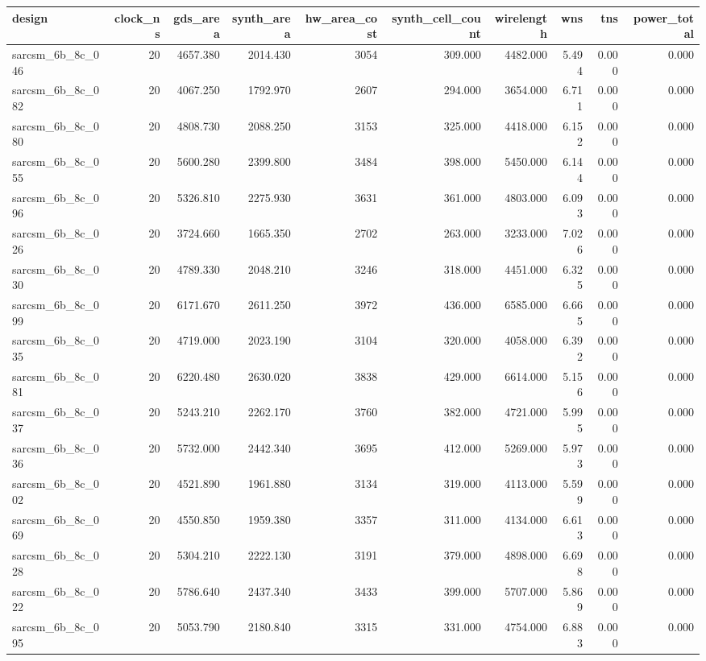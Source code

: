 \begin{tabular}{lrrrrrrrrr}
\toprule
design & clock\_ns & gds\_area & synth\_area & hw\_area\_cost & synth\_cell\_count & wirelength & wns & tns & power\_total \\
\midrule
sarcsm\_6b\_8c\_046 & 20 & 4657.380 & 2014.430 & 3054 & 309.000 & 4482.000 & 5.494 & 0.000 & 0.000 \\
sarcsm\_6b\_8c\_082 & 20 & 4067.250 & 1792.970 & 2607 & 294.000 & 3654.000 & 6.711 & 0.000 & 0.000 \\
sarcsm\_6b\_8c\_080 & 20 & 4808.730 & 2088.250 & 3153 & 325.000 & 4418.000 & 6.152 & 0.000 & 0.000 \\
sarcsm\_6b\_8c\_055 & 20 & 5600.280 & 2399.800 & 3484 & 398.000 & 5450.000 & 6.144 & 0.000 & 0.000 \\
sarcsm\_6b\_8c\_096 & 20 & 5326.810 & 2275.930 & 3631 & 361.000 & 4803.000 & 6.093 & 0.000 & 0.000 \\
sarcsm\_6b\_8c\_026 & 20 & 3724.660 & 1665.350 & 2702 & 263.000 & 3233.000 & 7.026 & 0.000 & 0.000 \\
sarcsm\_6b\_8c\_030 & 20 & 4789.330 & 2048.210 & 3246 & 318.000 & 4451.000 & 6.325 & 0.000 & 0.000 \\
sarcsm\_6b\_8c\_099 & 20 & 6171.670 & 2611.250 & 3972 & 436.000 & 6585.000 & 6.665 & 0.000 & 0.000 \\
sarcsm\_6b\_8c\_035 & 20 & 4719.000 & 2023.190 & 3104 & 320.000 & 4058.000 & 6.392 & 0.000 & 0.000 \\
sarcsm\_6b\_8c\_081 & 20 & 6220.480 & 2630.020 & 3838 & 429.000 & 6614.000 & 5.156 & 0.000 & 0.000 \\
sarcsm\_6b\_8c\_037 & 20 & 5243.210 & 2262.170 & 3760 & 382.000 & 4721.000 & 5.995 & 0.000 & 0.000 \\
sarcsm\_6b\_8c\_036 & 20 & 5732.000 & 2442.340 & 3695 & 412.000 & 5269.000 & 5.973 & 0.000 & 0.000 \\
sarcsm\_6b\_8c\_002 & 20 & 4521.890 & 1961.880 & 3134 & 319.000 & 4113.000 & 5.599 & 0.000 & 0.000 \\
sarcsm\_6b\_8c\_069 & 20 & 4550.850 & 1959.380 & 3357 & 311.000 & 4134.000 & 6.613 & 0.000 & 0.000 \\
sarcsm\_6b\_8c\_028 & 20 & 5304.210 & 2222.130 & 3191 & 379.000 & 4898.000 & 6.698 & 0.000 & 0.000 \\
sarcsm\_6b\_8c\_022 & 20 & 5786.640 & 2437.340 & 3433 & 399.000 & 5707.000 & 5.869 & 0.000 & 0.000 \\
sarcsm\_6b\_8c\_095 & 20 & 5053.790 & 2180.840 & 3315 & 331.000 & 4754.000 & 6.883 & 0.000 & 0.000 \\

\end{tabular}

